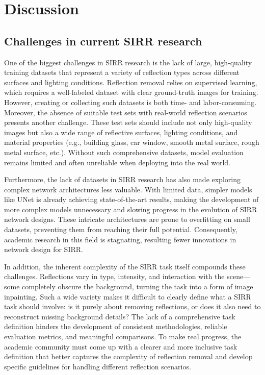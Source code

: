 \section{Discussion}
\label{sec:discussion}
\subsection{Challenges in current SIRR research}
One of the biggest challenges in SIRR research is the lack of large, high-quality training datasets that represent a variety of reflection types across different surfaces and lighting conditions. Reflection removal relies on supervised learning, which requires a well-labeled dataset with clear ground-truth images for training. However, creating or collecting such datasets is both time- and labor-consuming. Moreover, the absence of suitable test sets with real-world reflection scenarios presents another challenge. These test sets should include not only high-quality images but also a wide range of reflective surfaces, lighting conditions, and material properties (e.g., building glass, car window, smooth metal surface, rough metal surface, etc.). Without such comprehensive datasets, model evaluation remains limited and often unreliable when deploying into the real world.

Furthermore, the lack of datasets in SIRR research has also made exploring complex network architectures less valuable. With limited data, simpler models like UNet is already achieving state-of-the-art results, making the development of more complex models unnecessary and slowing progress in the evolution of SIRR network designs. These intricate architectures are prone to overfitting on small datasets, preventing them from reaching their full potential. Consequently, academic research in this field is stagnating, resulting fewer innovations in network design for SIRR.

In addition, the inherent complexity of the SIRR task itself compounds these challenges. Reflections vary in type, intensity, and interaction with the scene—some completely obscure the background, turning the task into a form of image inpainting. Such a wide variety makes it difficult to clearly define what a SIRR task should involve: is it purely about removing reflections, or does it also need to reconstruct missing background details? The lack of a comprehensive task definition hinders the development of consistent methodologies, reliable evaluation metrics, and meaningful comparisons. To make real progress, the academic community must come up with a clearer and more inclusive task definition that better captures the complexity of reflection removal and develop specific guidelines for handling different reflection scenarios.

